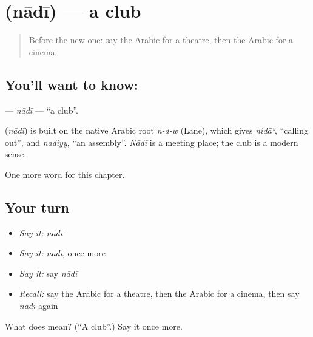 \section[\texorpdfstring{\ar{نادي} (nādī)}{نادي (nādī)}]{ (nādī) — a club}

\label{lesson:AR-C265-nadi}



\begin{quote}
Before the new one: say the Arabic for a theatre, then the Arabic for a cinema.
\end{quote}

\subsection*{You'll want to know: }
\textbf{} — \emph{nādī} — \textquotedblleft{}a club\textquotedblright{}.

\begin{cousinweb}
\textbf{} (\emph{nādī}) is built on the native Arabic root \emph{n-d-w} (Lane), which gives \emph{nidāʾ}, \textquotedblleft{}calling out\textquotedblright{}, and \emph{nadiyy}, \textquotedblleft{}an assembly\textquotedblright{}. \emph{Nādī} is a meeting place; the club is a modern sense.
\end{cousinweb}

\begin{grammarlens}[title={What you've built}]
One more word for this chapter.
\end{grammarlens}

\subsection*{Your turn}
\begin{itemize}
\raggedright
  \item \emph{Say it:} \emph{nādī}
  \item \emph{Say it:} \emph{nādī}, once more
  \item \emph{Say it:} say \emph{nādī}
  \item \emph{Recall:} say the Arabic for a theatre, then the Arabic for a cinema, then say \emph{nādī} again
\end{itemize}

\begin{tcolorbox}[breakable,colback=teal!4,colframe=teal!35!black,title={Before you move on}]
What does  mean? (\textquotedblleft{}A club\textquotedblright{}.) Say it once more.
\end{tcolorbox}
